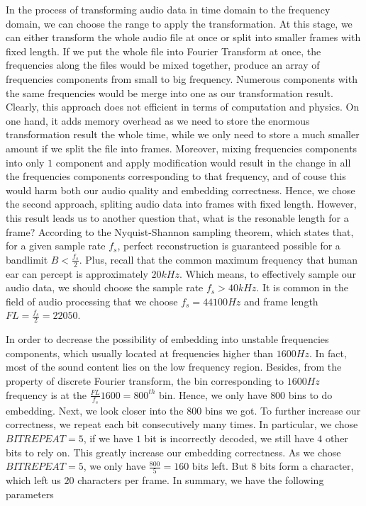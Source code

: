 \documentclass[conference]{IEEEtran}
\begin{document}
In the process of transforming audio data in time domain to the frequency domain, we can choose the range to apply the transformation. At this stage, we can either transform the whole audio file at once or split into smaller frames with fixed length. If we put the whole file into Fourier Transform at once, the frequencies along the files would be mixed together, produce an array of frequencies components from small to big frequency. Numerous components with the same frequencies would be merge into one as our transformation result. Clearly, this approach does not efficient in terms of computation and physics. On one hand, it adds memory overhead as we need to store the enormous transformation result the whole time, while we only need to store a much smaller amount if we split the file into frames. Moreover, mixing frequencies components into only \(1\) component and apply modification would result in the change in all the frequencies components corresponding to that frequency, and of couse this would harm both our audio quality and embedding correctness. Hence, we chose the second approach, spliting audio data into frames with fixed length. However, this result leads us to another question that, what is the resonable length for a frame? 
According to the Nyquist-Shannon sampling theorem, which states that, for a given sample rate \(f_s\), perfect reconstruction is guaranteed possible for a bandlimit \(B<\frac{f_s}{2}\). Plus, recall that the common maximum frequency that human ear can percept is approximately \(20kHz\). Which means, to effectively sample our audio data, we should choose the sample rate \(f_s>40kHz\). It is common in the field of audio processing that we choose \(f_s=44100Hz\) and frame length \(FL=\frac{f_s}{2}=22050\). 

In order to decrease the possibility of embedding into unstable frequencies components, which usually located at frequencies higher than \(1600Hz\). In fact, most of the sound content lies on the low frequency region. Besides, from the property of discrete Fourier transform, the bin corresponding to \(1600Hz\) frequency is at the \(\frac{FL}{f_s}1600=800^{th}\) bin. Hence, we only have \(800\) bins to do embedding.
Next, we look closer into the \(800\) bins we got. To further increase our correctness, we repeat each bit consecutively many times. In particular, we chose \(BITREPEAT=5\), if we have \(1\) bit is incorrectly decoded, we still have \(4\) other bits to rely on. This greatly increase our embedding correctness. As we chose \(BITREPEAT=5\), we only have \(\frac{800}{5}=160\) bits left. But \(8\) bits form a character, which left us \(20\) characters per frame. In summary, we have the following parameters
\end{document}

